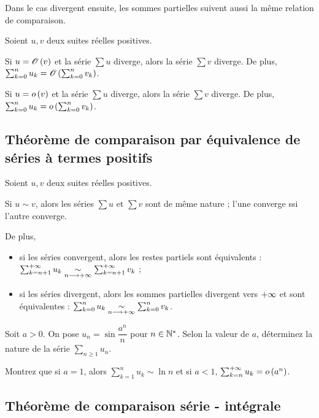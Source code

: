 Dans le cas divergent ensuite, les sommes partielles suivent aussi la même relation de comparaison.

\begin{theo}
Soient \(u,v\) deux suites réelles positives.

Si \(u=\mathscr{O}\left(v\right)\) et la série \(\sum u\) diverge, alors la série \(\sum v\) diverge. De plus, \(\sum_{k=0}^nu_k=\mathscr{O}\left(\sum_{k=0}^nv_k\right)\).

Si \(u=o\left(v\right)\) et la série \(\sum u\) diverge, alors la série \(\sum v\) diverge. De plus, \(\sum_{k=0}^nu_k=o\left(\sum_{k=0}^nv_k\right)\).
\end{theo}

\subsection{Théorème de comparaison par équivalence de séries à termes positifs}

\begin{theo}
Soient \(u,v\) deux suites réelles positives.

Si \(u\sim v\), alors les séries \(\sum u\) et \(\sum v\) sont de même nature ; l'une converge ssi l'autre converge.

De plus,

\begin{itemize}
    \item si les séries convergent, alors les restes partiels sont équivalents : \(\sum_{k=n+1}^{+\infty}u_k\underset{n\longrightarrow+\infty}{\sim}\sum_{k=n+1}^{+\infty}v_k\) ; \\
    \item si les séries divergent, alors les sommes partielles divergent vers \(+\infty\) et sont équivalentes : \(\sum_{k=0}^nu_k\underset{n\longrightarrow+\infty}{\sim}\sum_{k=0}^nv_k\).
\end{itemize}
\end{theo}

\begin{exo}
Soit \(a>0\). On pose \(u_n=\sin\dfrac{a^n}{n}\) pour \(n\in\mathbb{N}^*\). Selon la valeur de \(a\), déterminez la nature de la série \(\sum_{n\geq1}u_n\).

Montrez que si \(a=1\), alors \(\sum_{k=1}^nu_k\sim\ln n\) et si \(a<1\), \(\sum_{k=n}^{+\infty}u_k=o\left(a^n\right)\).
\end{exo}

\subsection{Théorème de comparaison série - intégrale}

